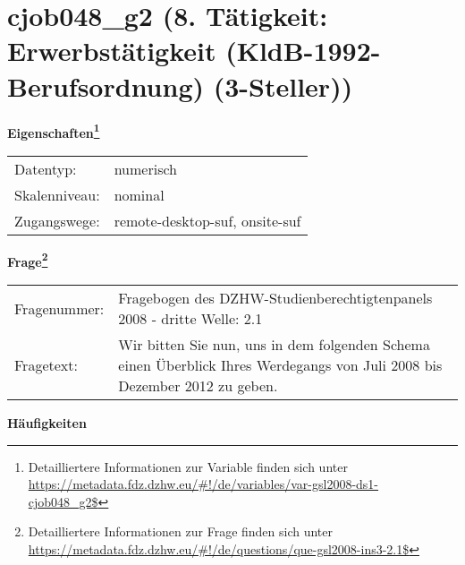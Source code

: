 
    \setcounter{footnote}{0}

    \vspace*{-1.8cm}
	\section{cjob048\_g2 (8. Tätigkeit: Erwerbstätigkeit (KldB-1992-Berufsordnung) (3-Steller))}
	\label{section:cjob048_g2}



    \vspace*{0.5cm}
    \noindent\textbf{Eigenschaften\footnote{Detailliertere Informationen zur Variable finden sich unter
		\url{https://metadata.fdz.dzhw.eu/\#!/de/variables/var-gsl2008-ds1-cjob048_g2$}}}\\
	\begin{tabularx}{\hsize}{@{}lX}
	Datentyp: & numerisch \\
	Skalenniveau: & nominal \\
	Zugangswege: &
	  remote-desktop-suf, 
	  onsite-suf
 \\
    \end{tabularx}



				\vspace*{0.5cm}
                \noindent\textbf{Frage\footnote{Detailliertere Informationen zur Frage finden sich unter
		              \url{https://metadata.fdz.dzhw.eu/\#!/de/questions/que-gsl2008-ins3-2.1$}}}\\
				\begin{tabularx}{\hsize}{@{}lX}
					Fragenummer: &
					  Fragebogen des DZHW-Studienberechtigtenpanels 2008 - dritte Welle:
					  2.1
 \\
					Fragetext: & Wir bitten Sie nun, uns in dem folgenden Schema einen Überblick Ihres Werdegangs von Juli 2008 bis Dezember 2012 zu geben. \\
				\end{tabularx}





        		\vspace*{0.5cm}
                \noindent\textbf{Häufigkeiten}

